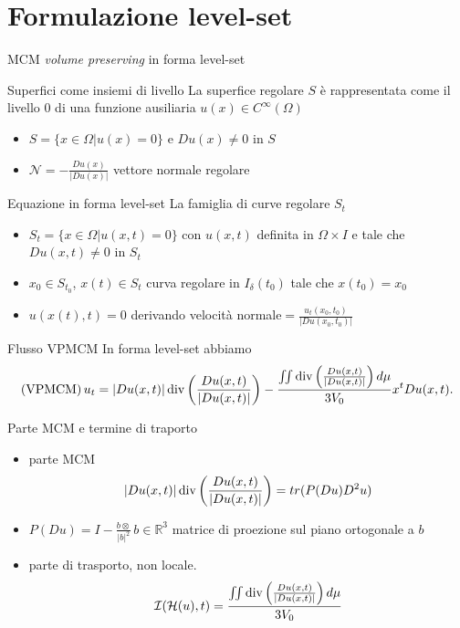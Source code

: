 \section{Formulazione level-set}
\begin{frame}{MCM \emph{volume preserving} in forma level-set}
  \begin{block}{Superfici come insiemi di livello}
    La superfice regolare $S$ è rappresentata come il livello $0$ di
    una funzione ausiliaria $u(x)\in C^{\infty}(\Omega)$
    \begin{itemize}
      \item $S=\{x\in\Omega | u(x)=0\}$ e $Du(x)\neq 0$ in $S$
      \item $\mathcal{N}=-\frac{Du(x)}{|Du(x)|}$ vettore normale
        regolare
    \end{itemize}
  \end{block}
  \begin{block}{Equazione in forma level-set}
    La famiglia di curve regolare $S_t$
    \begin{itemize}
      \item $S_t=\{x\in\Omega | u(x,t)=0\}$ con $u(x,t)$ definita in
        $\Omega\times I$ e tale che $Du(x,t)\neq 0$ in $S_t$
      \item $x_0\in S_{t_0}$, $x(t)\in S_t$ curva regolare in
        $I_{\delta}(t_0)$ tale che $x(t_0)=x_0$
      \item $u(x(t),t)=0$ derivando \alert{velocità normale}$=\frac{u_t(x_0,t_0)}{|Du(x_0,t_0)|}$
    \end{itemize}
  \end{block}
\end{frame}

\begin{frame}{Flusso VPMCM}
  In forma level-set abbiamo
    \[
      (\text{VPMCM})\,u_t=|Du(x,t)|\operatorname{div}\left(\frac{Du(x,t)}{|Du(x,t)|}\right)-\frac{\iint\operatorname{div}\left(\frac{Du(x,t)}{|Du(x,t)|}\right)d\mu}{3V_0}x^tDu(x,t). 
      \]
  \begin{block}{Parte MCM e termine di traporto} 
    \begin{itemize}
    \item parte MCM 
      \[
      |Du(x,t)|\operatorname{div}\left(\frac{Du(x,t)}{|Du(x,t)|}\right)=tr(P(Du)D^2u)
      \]
      \item $P(Du)=I-\frac{b\otimes }{|b|^2}\,b\in\mathbb{R}^3$
        matrice di proezione sul piano ortogonale a $b$
      \item parte di trasporto, non locale. 
        \[
        \mathcal{I}(\mathcal{H}(u),t)=\frac{\iint\operatorname{div}\left(\frac{Du(x,t)}{|Du(x,t)|}\right)d\mu}{3V_0}
        \]
     \end{itemize}
  \end{block}
\end{frame}

